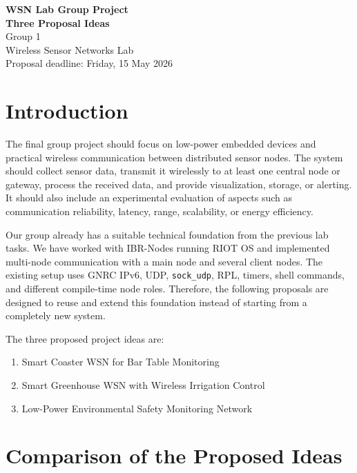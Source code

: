 \documentclass[11pt,a4paper]{article}
\begin{document}
\begin{center}
    {\LARGE \textbf{WSN Lab Group Project}}\\[0.3cm]
    {\large \textbf{Three Proposal Ideas}}\\[0.5cm]
    Group 1\\
    Wireless Sensor Networks Lab\\
    Proposal deadline: Friday, 15 May 2026
\end{center}

\vspace{0.8cm}

\section{Introduction}

The final group project should focus on low-power embedded devices and practical wireless communication between distributed sensor nodes. The system should collect sensor data, transmit it wirelessly to at least one central node or gateway, process the received data, and provide visualization, storage, or alerting. It should also include an experimental evaluation of aspects such as communication reliability, latency, range, scalability, or energy efficiency.

Our group already has a suitable technical foundation from the previous lab tasks. We have worked with IBR-Nodes running RIOT OS and implemented multi-node communication with a main node and several client nodes. The existing setup uses GNRC IPv6, UDP, \texttt{sock\_udp}, RPL, timers, shell commands, and different compile-time node roles. Therefore, the following proposals are designed to reuse and extend this foundation instead of starting from a completely new system.

The three proposed project ideas are:

\begin{enumerate}
    \item Smart Coaster WSN for Bar Table Monitoring
    \item Smart Greenhouse WSN with Wireless Irrigation Control
    \item Low-Power Environmental Safety Monitoring Network
\end{enumerate}

\section{Comparison of the Proposed Ideas}
\end{document}
